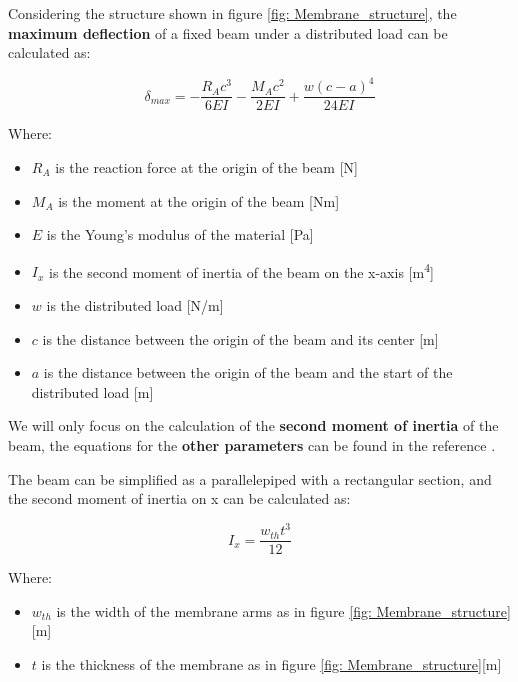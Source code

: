 \begin{samepage}
    Considering the structure shown in figure \ref{fig: Membrane_structure}, the \textbf{maximum deflection} of a fixed beam under a distributed load can be calculated as:
    \nopagebreak

    \begin{equation}
        \delta_{max} = -\frac{R_A c^3}{6 E I} - \frac{M_A c^2}{2EI} + \frac{w (c-a)^4}{24 EI}
        \label{eq: Beam_deflection}
    \end{equation}
    \nopagebreak

    Where:
    \nopagebreak

    \begin{itemize}
        \item $R_A$ is the reaction force at the origin of the beam [N]
        \item $M_A$ is the moment at the origin of the beam [Nm]
        \item $E$ is the Young's modulus of the material [Pa]
        \item $I_x$ is the second moment of inertia of the beam on the x-axis [m\textsuperscript{4}]
        \item $w$ is the distributed load [N/m]
        \item $c$ is the distance between the origin of the beam and its center [m]
        \item $a$ is the distance between the origin of the beam and the start of the distributed load [m]
    \end{itemize}
\end{samepage}

We will only focus on the calculation of the \textbf{second moment of inertia} of the beam, the equations for the \textbf{other parameters} can be found in the reference \cite{statics_fixed_beam}.

\begin{samepage}
    The beam can be simplified as a parallelepiped with a rectangular section, and the second moment of inertia on x can be calculated as:
    \nopagebreak
    
    \begin{equation}
        I_x = \frac{w_{th} t^3}{12}
        \label{eq: Beam_inertia}
    \end{equation}
    \nopagebreak

    Where:
    \nopagebreak
    
    \begin{itemize}
        \item $w_{th}$ is the width of the membrane arms as in figure \ref{fig: Membrane_structure}[m]
        \item $t$ is the thickness of the membrane as in figure \ref{fig: Membrane_structure}[m]
    \end{itemize}
\end{samepage}

